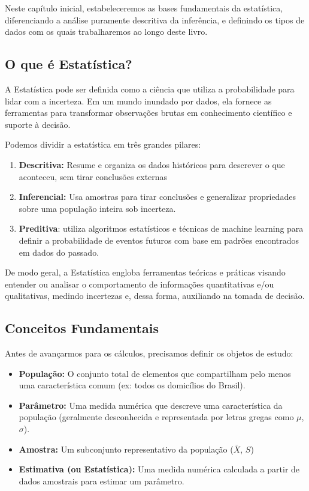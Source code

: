 \documentclass[
  letterpaper,
]{book}
\begin{document}
Neste capítulo inicial, estabeleceremos as bases fundamentais da
estatística, diferenciando a análise puramente descritiva da inferência,
e definindo os tipos de dados com os quais trabalharemos ao longo deste
livro.

\subsection{O que é Estatística?}\label{o-que-uxe9-estatuxedstica}

A Estatística pode ser definida como a ciência que utiliza a
probabilidade para lidar com a incerteza. Em um mundo inundado por
dados, ela fornece as ferramentas para transformar observações brutas em
conhecimento científico e suporte à decisão.

Podemos dividir a estatística em três grandes pilares:

\begin{enumerate}
\def\labelenumi{\arabic{enumi}.}
\item
  \textbf{Descritiva:} Resume e organiza os dados históricos para
  descrever o que aconteceu, sem tirar conclusões externas
\item
  \textbf{Inferencial:} Usa amostras para tirar conclusões e generalizar
  propriedades sobre uma população inteira sob incerteza.
\item
  \textbf{Preditiva}: utiliza algoritmos estatísticos e técnicas de
  machine learning para definir a probabilidade de eventos futuros com
  base em padrões encontrados em dados do passado.
\end{enumerate}

De modo geral, a Estatística engloba ferramentas teóricas e práticas
visando entender ou analisar o comportamento de informações
quantitativas e/ou qualitativas, medindo incertezas e, dessa forma,
auxiliando na tomada de decisão.

\subsection{Conceitos Fundamentais}\label{conceitos-fundamentais}

Antes de avançarmos para os cálculos, precisamos definir os objetos de
estudo:

\begin{itemize}
\item
  \textbf{População:} O conjunto total de elementos que compartilham
  pelo menos uma característica comum (ex: todos os domicílios do
  Brasil).
\item
  \textbf{Parâmetro:} Uma medida numérica que descreve uma
  característica da população (geralmente desconhecida e representada
  por letras gregas como \(\mu\), \(\sigma\)).
\item
  \textbf{Amostra:} Um subconjunto representativo da população
  (\(\bar{X}\), \(S\))
\item
  \textbf{Estimativa (ou Estatística):} Uma medida numérica calculada a
  partir de dados amostrais para estimar um parâmetro.
\end{itemize}
\end{document}
